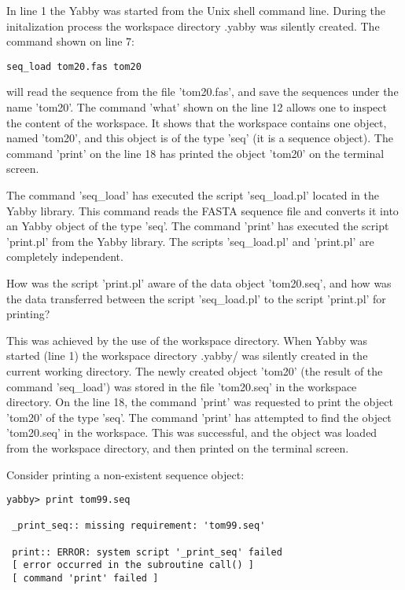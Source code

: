 In line 1 the Yabby was started from the Unix shell command line.
During the initalization process the workspace directory .yabby
was silently created. The command shown on line 7:

\begin{verbatim}
seq_load tom20.fas tom20
\end{verbatim}

will read the sequence from the file 'tom20.fas', and save the sequences
under the name 'tom20'. The command 'what' shown on the line 12 allows
one to inspect the content of the workspace. It shows that the workspace
contains one object, named 'tom20', and this object is of the type 'seq'
(it is a sequence object).  The command 'print' on the line 18 has
printed the object 'tom20' on the terminal screen.

The command 'seq\_load' has executed the script 'seq\_load.pl'
located in the Yabby library. This command reads the FASTA sequence
file and converts it into an Yabby object of the type 'seq'. The
command 'print' has executed the script 'print.pl' from the Yabby
library. The scripts 'seq\_load.pl' and 'print.pl' are completely
independent.

How was the script 'print.pl' aware of the data object 'tom20.seq',
and how was the data transferred between the script 'seq\_load.pl'
to the script 'print.pl' for printing?

This was achieved by the use of the workspace directory. When Yabby
was started (line 1) the workspace directory .yabby/ was silently
created in the current working directory. The newly created object
'tom20' (the result of the command 'seq\_load') was stored in the
file 'tom20.seq' in the workspace directory. On the line 18, the
command 'print' was requested to print the object 'tom20' of the
type 'seq'. The command 'print' has attempted to find the object
'tom20.seq' in the workspace. This was successful, and the object
was loaded from the workspace directory, and then printed on the
terminal screen.

Consider printing a non-existent sequence object:

\begin{verbatim}
yabby> print tom99.seq

 _print_seq:: missing requirement: 'tom99.seq'

 print:: ERROR: system script '_print_seq' failed
 [ error occurred in the subroutine call() ]
 [ command 'print' failed ]
\end{verbatim}

